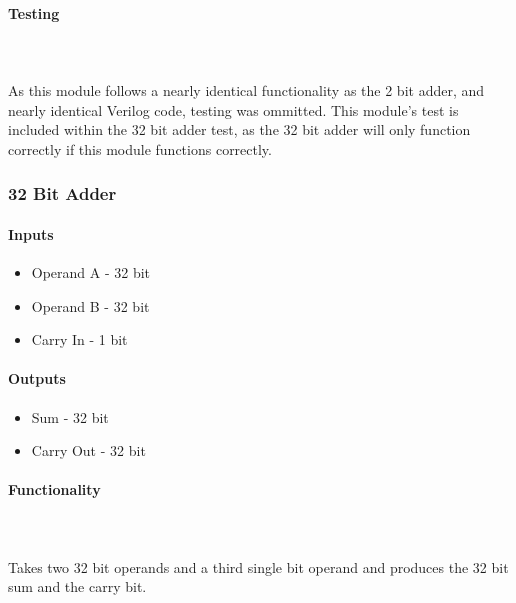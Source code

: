 \documentclass{article}
\begin{document}
       \paragraph{Testing}
       \hfill\\\\
       As this module follows a nearly identical functionality as the 2
       bit adder, and nearly identical Verilog code, testing was ommitted.
       This module's test is included within the 32 bit adder test, as the
       32 bit adder will only function correctly if this module functions
       correctly.




    \subsubsection{32 Bit Adder}

    \paragraph{Inputs}
    \begin{itemize}
        \item Operand A - 32 bit
        \item Operand B - 32 bit
        \item Carry In - 1 bit
    \end{itemize}

    \paragraph{Outputs}
    \begin{itemize}
        \item Sum - 32 bit
        \item Carry Out - 32 bit
    \end{itemize}

    \paragraph{Functionality}
    \hfill\\\\
    Takes two 32 bit operands and a third single bit operand and produces the
    32 bit sum and the carry bit.
\end{document}
